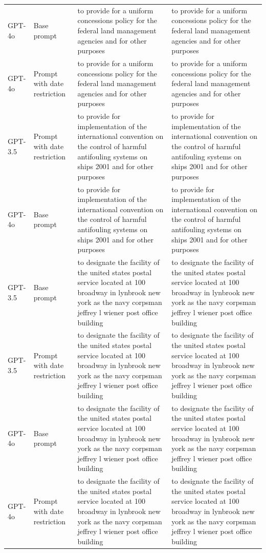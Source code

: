 \begin{longtable}{>{\raggedright\arraybackslash}p{1.4cm}>{\raggedright\arraybackslash}p{1.4cm}>{\raggedright\arraybackslash}p{5.5cm}>{\raggedright\arraybackslash}p{5.5cm}}
GPT-4o & Base prompt & to provide for a uniform concessions policy for the federal land management agencies and for other purposes & to provide for a uniform concessions policy for the federal land management agencies and for other purposes\\
GPT-4o & Prompt with date restriction & to provide for a uniform concessions policy for the federal land management agencies and for other purposes & to provide for a uniform concessions policy for the federal land management agencies and for other purposes\\
GPT-3.5 & Prompt with date restriction & to provide for implementation of the international convention on the control of harmful antifouling systems on ships 2001 and for other purposes & to provide for implementation of the international convention on the control of harmful antifouling systems on ships 2001 and for other purposes\\
GPT-4o & Base prompt & to provide for implementation of the international convention on the control of harmful antifouling systems on ships 2001 and for other purposes & to provide for implementation of the international convention on the control of harmful antifouling systems on ships 2001 and for other purposes\\
GPT-3.5 & Base prompt & to designate the facility of the united states postal service located at 100 broadway in lynbrook new york as the navy corpsman jeffrey l wiener post office building & to designate the facility of the united states postal service located at 100 broadway in lynbrook new york as the navy corpsman jeffrey l wiener post office building\\
GPT-3.5 & Prompt with date restriction & to designate the facility of the united states postal service located at 100 broadway in lynbrook new york as the navy corpsman jeffrey l wiener post office building & to designate the facility of the united states postal service located at 100 broadway in lynbrook new york as the navy corpsman jeffrey l wiener post office building\\
GPT-4o & Base prompt & to designate the facility of the united states postal service located at 100 broadway in lynbrook new york as the navy corpsman jeffrey l wiener post office building & to designate the facility of the united states postal service located at 100 broadway in lynbrook new york as the navy corpsman jeffrey l wiener post office building\\
GPT-4o & Prompt with date restriction & to designate the facility of the united states postal service located at 100 broadway in lynbrook new york as the navy corpsman jeffrey l wiener post office building & to designate the facility of the united states postal service located at 100 broadway in lynbrook new york as the navy corpsman jeffrey l wiener post office building\\

\end{longtable}
